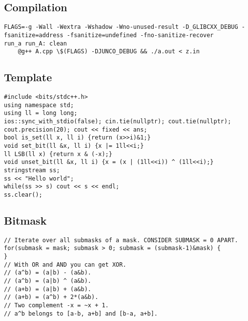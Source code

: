 \documentclass[a4paper]{article}
\begin{document}
\subsection*{Compilation}
\begin{verbatim}
FLAGS=-g -Wall -Wextra -Wshadow -Wno-unused-result -D_GLIBCXX_DEBUG -fsanitize=address -fsanitize=undefined -fno-sanitize-recover
run_a run_A: clean
	@g++ A.cpp \$(FLAGS) -DJUNCO_DEBUG && ./a.out < z.in
\end{verbatim}
\subsection*{Template}
\begin{verbatim}
#include <bits/stdc++.h>
using namespace std;
using ll = long long;
ios::sync_with_stdio(false); cin.tie(nullptr); cout.tie(nullptr);
cout.precision(20); cout << fixed << ans;
bool is_set(ll x, ll i) {return (x>>i)&1;}
void set_bit(ll &x, ll i) {x |= 1ll<<i;}
ll LSB(ll x) {return x & (-x);}
void unset_bit(ll &x, ll i) {x = (x | (1ll<<i)) ^ (1ll<<i);}
stringstream ss;
ss << "Hello world";
while(ss >> s) cout << s << endl;
ss.clear();
\end{verbatim}
\subsection*{Bitmask}
\begin{verbatim}
// Iterate over all submasks of a mask. CONSIDER SUBMASK = 0 APART.
for(submask = mask; submask > 0; submask = (submask-1)&mask) {
}
// With OR and AND you can get XOR. 
// (a^b) = (a|b) - (a&b).
// (a^b) = (a|b) ^ (a&b).
// (a+b) = (a|b) + (a&b).
// (a+b) = (a^b) + 2*(a&b).
// Two complement -x = ~x + 1.
// a^b belongs to [a-b, a+b] and [b-a, a+b].
\end{verbatim}
\end{document}

